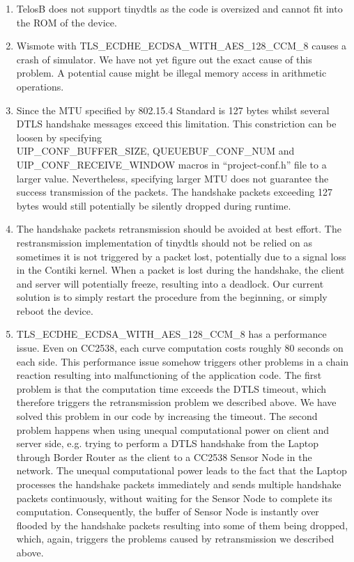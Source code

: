 \begin{enumerate}
	\item TelosB does not support tinydtls as the code is oversized and cannot fit into the ROM of the device.
	\item Wismote with TLS\_ECDHE\_ECDSA\_WITH\_AES\_128\_CCM\_8 causes a crash of simulator. We have not yet figure out the exact cause of this problem. A potential cause might be illegal memory access in arithmetic operations.
	\item Since the MTU specified by 802.15.4 Standard is 127 bytes whilst several DTLS handshake messages exceed this limitation. This constriction can be loosen by specifying\\ UIP\_CONF\_BUFFER\_SIZE, QUEUEBUF\_CONF\_NUM and UIP\_CONF\_RECEIVE\_WINDOW macros in ``project-conf.h'' file to a larger value. Nevertheless, specifying larger MTU does not guarantee the success transmission of the packets. The handshake packets exceeding 127 bytes would still potentially be silently dropped during runtime.
	\item The handshake packets retransmission should be avoided at best effort. The restransmission implementation of tinydtls should not be relied on as sometimes it is not triggered by a packet lost, potentially due to a signal loss in the Contiki kernel. When a packet is lost during the handshake, the client and server will potentially freeze, resulting into a deadlock. Our current solution is to simply restart the procedure from the beginning, or simply reboot the device.
	\item TLS\_ECDHE\_ECDSA\_WITH\_AES\_128\_CCM\_8 has a performance issue. Even on CC2538, each curve computation costs roughly 80 seconds on each side. This performance issue somehow triggers other problems in a chain reaction resulting into malfunctioning of the application code. The first problem is that the computation time exceeds the DTLS timeout, which therefore triggers the retransmission problem we described above. We have solved this problem in our code by increasing the timeout. The second problem happens when using  unequal computational power on client and server side, e.g. trying to perform a DTLS handshake from the Laptop through Border Router as the client to a CC2538 Sensor Node in the network. The unequal computational power leads to the fact that the Laptop processes the handshake packets immediately and sends multiple handshake packets continuously, without waiting for the Sensor Node to complete its computation. Consequently, the buffer of Sensor Node is instantly over flooded by the handshake packets resulting into some of them being dropped, which, again, triggers the problems caused by retransmission we described above. 

\end{enumerate}
